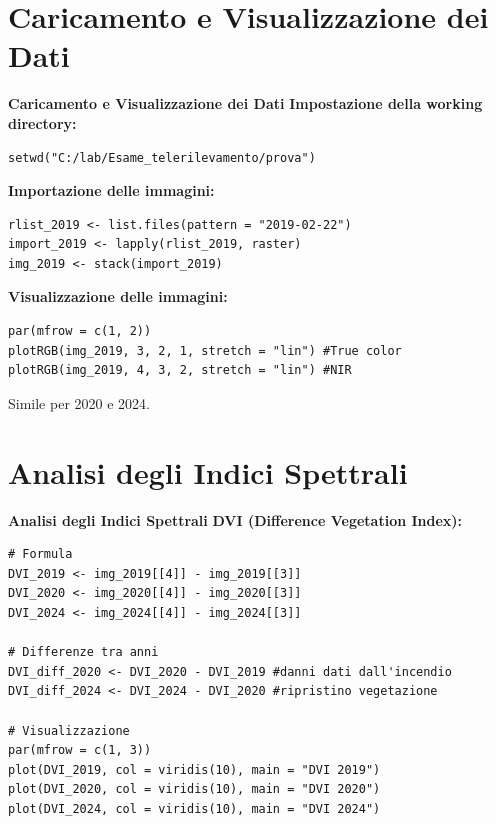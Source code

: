 \documentclass{beamer}
\begin{document}
\section{Caricamento e Visualizzazione dei Dati}

\begin{frame}[fragile]{\textbf{Caricamento e Visualizzazione dei Dati}}
\textbf{Impostazione della working directory:}
\begin{lstlisting}
setwd("C:/lab/Esame_telerilevamento/prova")
\end{lstlisting}

\textbf{Importazione delle immagini:}
\begin{lstlisting}
rlist_2019 <- list.files(pattern = "2019-02-22")
import_2019 <- lapply(rlist_2019, raster)
img_2019 <- stack(import_2019)
\end{lstlisting}

\textbf{Visualizzazione delle immagini:}
\begin{lstlisting}
par(mfrow = c(1, 2))
plotRGB(img_2019, 3, 2, 1, stretch = "lin") #True color
plotRGB(img_2019, 4, 3, 2, stretch = "lin") #NIR
\end{lstlisting}
Simile per 2020 e 2024.
\end{frame}

\section{Analisi degli Indici Spettrali}

\begin{frame}[fragile]{\textbf{Analisi degli Indici Spettrali}}
\textbf{DVI (Difference Vegetation Index):}
\begin{lstlisting}
# Formula
DVI_2019 <- img_2019[[4]] - img_2019[[3]]
DVI_2020 <- img_2020[[4]] - img_2020[[3]]
DVI_2024 <- img_2024[[4]] - img_2024[[3]]

# Differenze tra anni
DVI_diff_2020 <- DVI_2020 - DVI_2019 #danni dati dall'incendio
DVI_diff_2024 <- DVI_2024 - DVI_2020 #ripristino vegetazione

# Visualizzazione
par(mfrow = c(1, 3))
plot(DVI_2019, col = viridis(10), main = "DVI 2019")
plot(DVI_2020, col = viridis(10), main = "DVI 2020")
plot(DVI_2024, col = viridis(10), main = "DVI 2024")
\end{lstlisting}
\end{frame}
\end{document}
